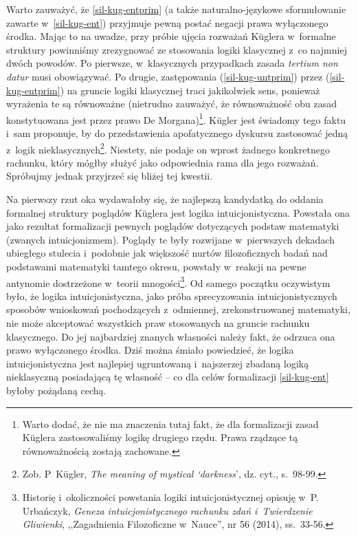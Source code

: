 Warto zauważyć, że \ref{sil-kug-entprim} (a także naturalno-językowe sformułowanie zawarte w~\ref{sil-kug-ent}) przyjmuje pewną postać negacji prawa wyłączonego środka. Mając to na uwadze, przy próbie ujęcia rozważań Küglera w~formalne struktury powinniśmy zrezygnować ze stosowania logiki klasycznej z~co najmniej dwóch powodów. Po pierwsze, w~klasycznych przypadkach zasada \textit{tertium non datur} musi obowiązywać. Po drugie, zastępowania (\ref{sil-kug-untprim}) przez (\ref{sil-kug-entprim}) na gruncie logiki klasycznej traci jakikolwiek sens, ponieważ wyrażenia te są równoważne (nietrudno zauważyć, że równoważność obu zasad konstytuowana jest przez prawo De Morgana)\footnote{Warto dodać, że nie ma znaczenia tutaj fakt, że dla formalizacji zasad Küglera zastosowaliśmy logikę drugiego rzędu. Prawa rządzące tą równoważnością zostają zachowane.}. Kügler jest świadomy tego faktu i~sam proponuje, by do przedstawienia apofatycznego dyskursu zastosować jedną z~logik nieklasycznych\footnote{Zob. P~Kügler, \textit{The meaning of mystical ‘darkness}', dz. cyt., s.~98-99.}. Niestety, nie podaje on wprost żadnego konkretnego rachunku, który mógłby służyć jako odpowiednia rama dla jego rozważań. Spróbujmy jednak przyjrzeć się bliżej tej kwestii.

Na pierwszy rzut oka wydawałoby się, że najlepszą kandydatką do oddania formalnej struktury poglądów Küglera jest logika intuicjonistyczna. Powstała ona jako rezultat formalizacji pewnych poglądów dotyczących podstaw matematyki (zwanych intuicjonizmem). Poglądy te były rozwijane w~pierwszych dekadach ubiegłego stulecia i~podobnie jak większość nurtów filozoficznych badań nad podstawami matematyki tamtego okresu, powstały w~reakcji na pewne antynomie dostrzeżone w~teorii mnogości\footnote{Historię i~okoliczności powstania logiki intuicjonistycznej opisuję w~P. Urbańczyk, \textit{Geneza intuicjonistycznego rachunku zdań i~Twierdzenie Gliwienki}, ,,Zagadnienia Filozoficzne w~Nauce'', nr 56 (2014), ss.~33-56.}. Od samego początku oczywistym było, że logika intuicjonistyczna, jako próba sprecyzowania intuicjonistycznych sposobów wnioskowań pochodzących z~odmiennej, zrekonstruowanej matematyki, nie może akceptować wszystkich praw stosowanych na gruncie rachunku klasycznego. Do jej najbardziej znanych własności należy fakt, że odrzuca ona prawo wyłączonego środka. Dziś można śmiało powiedzieć, że logika intuicjonistyczna jest najlepiej ugruntowaną i~najszerzej zbadaną logiką nieklasyczną posiadającą tę własność -- co dla celów formalizacji \ref{sil-kug-ent} byłoby pożądaną cechą.

